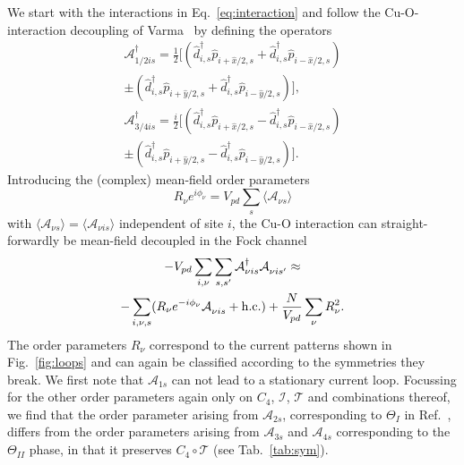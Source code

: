 \documentclass[prb, twocolumn,showpacs,preprintnumbers,amsmath,amssymb, floatfix]{revtex4}
\begin{document}
We start with the interactions in Eq.~\eqref{eq:interaction} and follow the Cu-O-interaction decoupling of Varma~\cite{varma:2006b} by defining the operators
\begin{multline}
  \mathcal{A}^{\dag}_{1/2 is} = \frac12\Big[(\hat{d}^{\dag}_{i,s}\hat{p}^{\phantom{\dag}}_{i+\hat{x}/2, s}+\hat{d}^{\dag}_{i,s}\hat{p}^{\phantom{\dag}}_{i-\hat{x}/2, s})\\ 
  \pm (\hat{d}^{\dag}_{i,s}\hat{p}^{\phantom{\dag}}_{i+\hat{y}/2, s}+\hat{d}^{\dag}_{i,s}\hat{p}^{\phantom{\dag}}_{i-\hat{y}/2, s})\Big],
  \label{eq:a12}
\end{multline}
\begin{multline}
  \mathcal{A}^{\dag}_{3/4 i s} = \frac i2\Big[(\hat{d}^{\dag}_{i,s}\hat{p}^{\phantom{\dag}}_{i+\hat{x}/2, s}-\hat{d}^{\dag}_{i,s}\hat{p}^{\phantom{\dag}}_{i-\hat{x}/2, s})\\
  \pm (\hat{d}^{\dag}_{i,s}\hat{p}^{\phantom{\dag}}_{i+\hat{y}/2, s}-\hat{d}^{\dag}_{i,s}\hat{p}^{\phantom{\dag}}_{i-\hat{y}/2, s})\Big].
  \label{eq:a34}
\end{multline}
Introducing the (complex) mean-field order parameters
\begin{equation}
  R_{\nu} e^{i \phi_{\nu}} = V_{pd}\sum_{s}\langle \mathcal{A}_{\nu s}\rangle
  \label{eq:mftop}
\end{equation}
with $\langle \mathcal{A}_{\nu s}\rangle = \langle \mathcal{A}_{\nu i s}\rangle$ independent of site $i$, the Cu-O interaction can straight-forwardly be mean-field decoupled in the Fock channel
\begin{multline}
  -V_{pd}\sum_{i,\nu}\sum_{s, s'} \mathcal{A}^{\dag}_{\nu i s} \mathcal{A}^{\phantom{\dag}}_{\nu i s'}\approx\\
  -\sum_{i, \nu, s} (R_{\nu}e^{-i\phi_{\nu}} \mathcal{A}^{\phantom{\dag}}_{\nu i s} + {\rm h.c.}) + \frac{N}{V_{pd}} \sum_{\nu}R_{\nu}^2.
  \label{eq:newvpd}
\end{multline}
The order parameters $R_{\nu}$ correspond to the current patterns shown in Fig.~\ref{fig:loops} and can again be classified according to the symmetries they break. We first note that $\mathcal{A}_{1 s}$ can not lead to a stationary current loop. Focussing for the other order parameters again only on $C_4$, $\mathcal{I}$, $\mathcal{T}$ and combinations thereof, we find that the order parameter arising from $\mathcal{A}_{2s}$, corresponding to $\Theta_I$ in Ref.~\cite{varma:2006b}, differs from the order parameters arising from $\mathcal{A}_{3s}$ and $\mathcal{A}_{4s}$ corresponding to the $\Theta_{II}$ phase, in that it preserves $C_4\circ \mathcal{T}$ (see Tab.~\ref{tab:sym}). 
\end{document}
